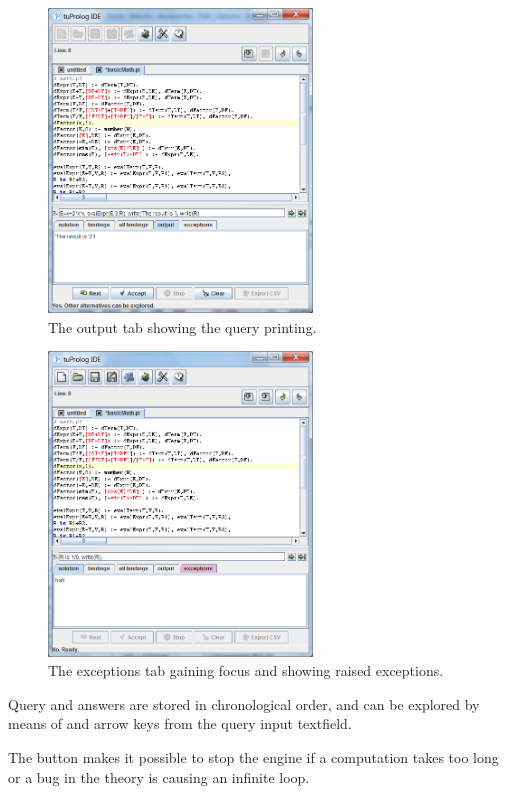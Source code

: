 \begin{figure}
\centering
\includegraphics[width=7cm]{images/gui-output}
\caption{The output tab showing the query printing.}
\label{fig:gui-output}
\end{figure}

\begin{figure}
\centering
\includegraphics[width=7cm]{images/gui-exceptions}
\caption{The exceptions tab gaining focus and showing raised exceptions.}
\label{fig:gui-exceptions}
\end{figure}
Query and answers are stored in chronological order, and can be explored by means of  and  arrow keys from the query input textfield.

The  button makes it possible to stop the engine if a computation takes too long or a bug in the theory is causing an infinite loop.

